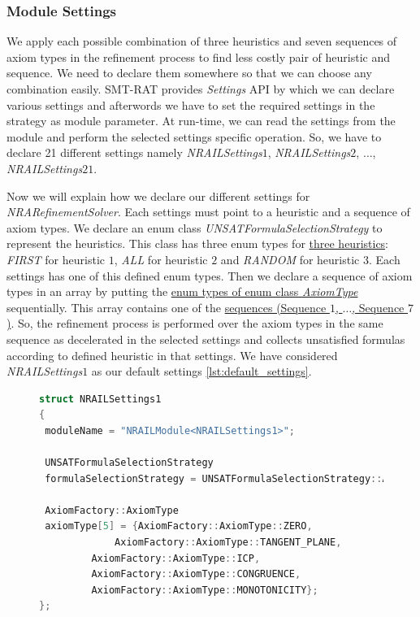 \subsubsection{Module Settings}
\label{subsubsec:Module_Settings}
\begin{sloppypar}
We apply each possible combination of three heuristics and seven sequences of axiom types in the refinement process to find less costly pair of heuristic and sequence.
We need to declare them somewhere so that we can choose any combination easily.
SMT-RAT provides \textit{Settings} API by which we can declare various settings and afterwords we have to set the required settings in the strategy as module parameter.
At run-time, we can read the settings from the module and perform the selected settings specific operation.
So, we have to declare 21 different settings namely \textit{NRAILSettings$1$}, \textit{NRAILSettings$2$}, $\dots$, \textit{NRAILSettings$21$}.\newline

\noindent Now we will explain how we declare our different settings for \textit{NRARefinementSolver}.
Each settings must point to a heuristic and a sequence of axiom types.
We declare an enum class \textit{UNSATFormulaSelectionStrategy} to represent the heuristics.
This class has three enum types for \hyperref[item:heuristics]{three heuristics}: \textit{FIRST} for heuristic $1$, \textit{ALL} for heuristic $2$ and \textit{RANDOM} for heuristic $3$.
Each settings has one of this defined enum types.
Then we declare a sequence of axiom types in an array by putting the \hyperref[table:axiomType]{enum types of enum class \textit{AxiomType}} sequentially.
This array contains one of the \hyperref[item:sequences]{sequences (Sequence $1$, $\dots$, Sequence $7$)}.
So, the refinement process is performed over the axiom types in the same sequence as decelerated in the selected settings and collects unsatisfied formulas according to defined heuristic in that settings.
We have considered \textit{NRAILSettings$1$} as our default settings \ref{lst:default_settings}.\newline
\end{sloppypar}

\begin{figure}[!ht]
\begin{lstlisting}[language=C++,label=lst:default_settings, caption={Default settings}]
struct NRAILSettings1
{
 moduleName = "NRAILModule<NRAILSettings1>";

 UNSATFormulaSelectionStrategy 
 formulaSelectionStrategy = UNSATFormulaSelectionStrategy::ALL;

 AxiomFactory::AxiomType
 axiomType[5] = {AxiomFactory::AxiomType::ZERO,
	         AxiomFactory::AxiomType::TANGENT_PLANE,
		 AxiomFactory::AxiomType::ICP,
		 AxiomFactory::AxiomType::CONGRUENCE,
		 AxiomFactory::AxiomType::MONOTONICITY};
};
\end{lstlisting}
\end{figure}

